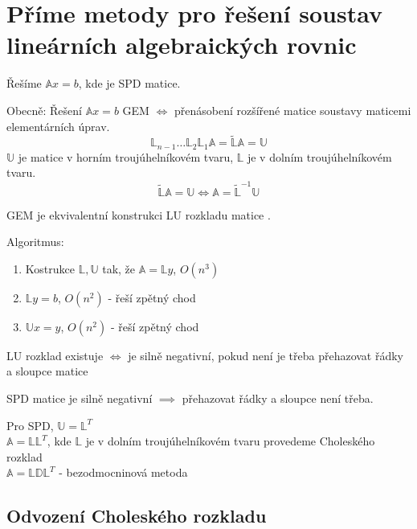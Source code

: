 \documentclass[../main.tex]{subfiles}
\begin{document}
\section{Příme metody pro řešení soustav lineárních algebraických rovnic}
Řešíme $\mathbb{A}x = b$, kde \matA je SPD matice.

Obecně: Řešení $\mathbb{A}x = b$ GEM $\Leftrightarrow$ přenásobení rozšířené matice soustavy maticemi 
elementárních úprav. 
\begin{equation*}
    \mathbb{L}_{n-1}\dots\mathbb{L}_{2}\mathbb{L}_{1}\mathbb{A} = \tilde{\mathbb{L}}\mathbb{A} = \mathbb{U}
\end{equation*}
$\mathbb{U}$ je matice v horním troujúhelníkovém tvaru, $\mathbb{L}$ je v dolním troujúhelníkovém tvaru.
\begin{equation*}
    \tilde{\mathbb{L}}\mathbb{A}=\mathbb{U} \Leftrightarrow \mathbb{A} = \tilde{\mathbb{L}}^{-1}\mathbb{U}
\end{equation*}

GEM je ekvivalentní konstrukci LU rozkladu matice \matA .

Algoritmus:
\begin{enumerate}
    \item Kostrukce $\mathbb{L}, \mathbb{U}$ tak, že $\mathbb{A} = \mathbb{L} y$, $O(n^3)$
    \item $\mathbb{L} y = b$, $O(n^2)$ - řeší zpětný chod
    \item $\mathbb{U} x = y$, $O(n^2)$ - řeší zpětný chod
\end{enumerate}


LU rozklad existuje $\Leftrightarrow$ \matA je silně negativní, pokud není je třeba přehazovat
řádky a sloupce matice \matA

SPD matice je silně negativní $\implies$ přehazovat řádky a sloupce není třeba.




Pro \matA SPD, $\mathbb{U} = \mathbb{L}^T$\\
$\mathbb{A} = \mathbb{L}\mathbb{L}^T$, kde $\mathbb{L}$ je v dolním troujúhelníkovém tvaru provedeme Choleského rozklad\\
$\mathbb{A} = \mathbb{L}\mathbb{D}\mathbb{L}^T$ - bezodmocninová metoda 





\subsection{Odvození Choleského rozkladu}
\end{document}
